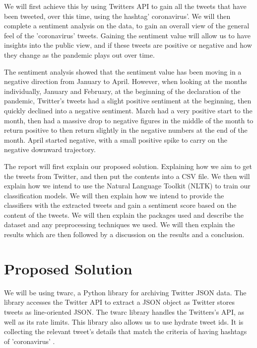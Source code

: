 \documentclass[a4paper,10pt]{article}
\begin{document}
We will first achieve this by using Twitters API to gain all the tweets that have been tweeted, over this time, using the hashtag' coronavirus'. We will then complete a sentiment analysis on the data, to gain an overall view of the general feel of the 'coronavirus' tweets. Gaining the sentiment value will allow us to have insights into the public view, and if these tweets are positive or negative and how they change as the pandemic plays out over time. 

The sentiment analysis showed that the sentiment value has been moving in a negative direction from January to April. However, when looking at the months individually, January and February, at the beginning of the declaration of the pandemic, Twitter's tweets had a slight positive sentiment at the beginning, then quickly declined into a negative sentiment. March had a very positive start to the month, then had a massive drop to negative figures in the middle of the month to return positive to then return slightly in the negative numbers at the end of the month. April started negative, with a small positive spike to carry on the negative downward trajectory.

The report will first explain our proposed solution. Explaining how we aim to get the tweets from Twitter, and then put the contents into a CSV file. We then will explain how we intend to use the Natural Language Toolkit (NLTK) to train our classification models. We will then explain how we intend to provide the classifiers with the extracted tweets and gain a sentiment score based on the content of the tweets. We will then explain the packages used and describe the dataset and any preprocessing techniques we used. We will then explain the results which are then followed by a discussion on the results and a conclusion.

\section{Proposed Solution}
We will be using twarc, a Python library for archiving Twitter JSON data. The library accesses the Twitter API to extract a JSON object as Twitter stores tweets as line-oriented JSON. The twarc library handles the Twitters's API, as well as its rate limits. This library also allows us to use hydrate tweet ids. It is collecting the relevant tweet's details that match the criteria of having hashtags of 'coronavirus' \cite{twarc}.
\end{document}
